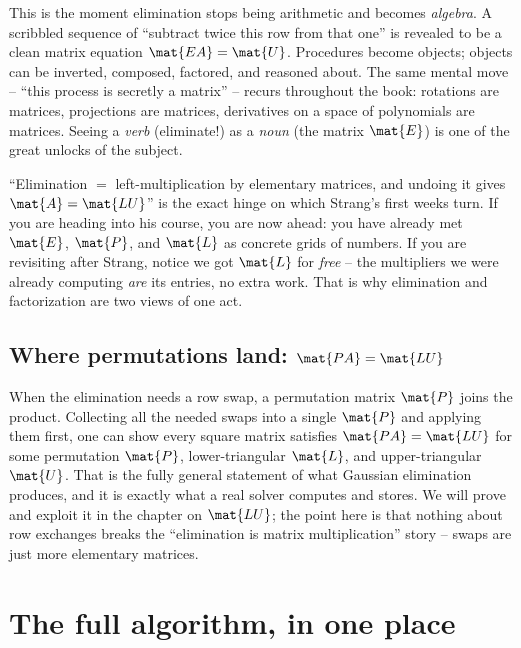 \begin{aestheticbox}
This is the moment elimination stops being arithmetic and becomes \emph{algebra}.
A scribbled sequence of ``subtract twice this row from that one'' is revealed to
be a clean matrix equation $\mat{EA}=\mat{U}$. Procedures become objects;
objects can be inverted, composed, factored, and reasoned about. The same
mental move -- ``this process is secretly a matrix'' -- recurs throughout the
book: rotations are matrices, projections are matrices, derivatives on a space of
polynomials are matrices. Seeing a \emph{verb} (eliminate!) as a \emph{noun} (the
matrix $\mat{E}$) is one of the great unlocks of the subject.
\end{aestheticbox}

\begin{strangbox}
``Elimination $=$ left-multiplication by elementary matrices, and undoing it
gives $\mat{A}=\mat{LU}$'' is the exact hinge on which Strang's first weeks turn.
If you are heading into his course, you are now ahead: you have already met
$\mat{E}$, $\mat{P}$, and $\mat{L}$ as concrete grids of numbers. If you are
revisiting after Strang, notice we got $\mat{L}$ for \emph{free} -- the
multipliers we were already computing \emph{are} its entries, no extra work.
That is why elimination and factorization are two views of one act.
\end{strangbox}

\subsection{Where permutations land: $\mat{PA}=\mat{LU}$}

When the elimination needs a row swap, a permutation matrix $\mat{P}$ joins the
product. Collecting all the needed swaps into a single $\mat{P}$ and applying
them first, one can show every square matrix satisfies $\mat{PA}=\mat{LU}$ for
some permutation $\mat{P}$, lower-triangular $\mat{L}$, and upper-triangular
$\mat{U}$. That is the fully general statement of what Gaussian elimination
produces, and it is exactly what a real solver computes and stores. We will prove
and exploit it in the chapter on $\mat{LU}$; the point here is that nothing about
row exchanges breaks the ``elimination is matrix multiplication'' story -- swaps
are just more elementary matrices.

\section{The full algorithm, in one place}


